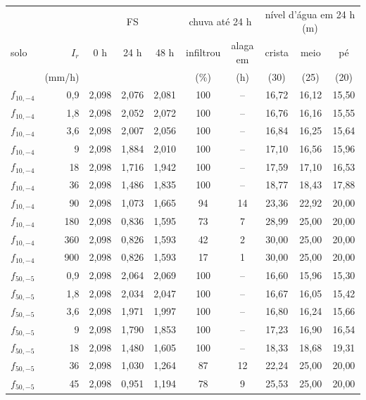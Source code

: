 \begin{tabular}{lr|ccc|cc|ccc}
\toprule
 & & \multicolumn{3}{c|}{FS} & \multicolumn{2}{c|}{chuva até 24 h} & \multicolumn{3}{c}{nível d'água em 24 h (m)}\\
solo & $I_r$ & 0 h & 24 h & 48 h & infiltrou & alaga em & crista & meio & pé\\
 & (mm/h) & & & & (\%) & (h) & (30) & (25) & (20)\\
\midrule
$f_{10,-4}$ & 0{,}9 & 2{,}098 & 2{,}076 & 2{,}081 & 100 & -- & 16{,}72 & 16{,}12 & 15{,}50\\
$f_{10,-4}$ & 1{,}8 & 2{,}098 & 2{,}052 & 2{,}072 & 100 & -- & 16{,}76 & 16{,}16 & 15{,}55\\
$f_{10,-4}$ & 3{,}6 & 2{,}098 & 2{,}007 & 2{,}056 & 100 & -- & 16{,}84 & 16{,}25 & 15{,}64\\
$f_{10,-4}$ & 9 & 2{,}098 & 1{,}884 & 2{,}010 & 100 & -- & 17{,}10 & 16{,}56 & 15{,}96\\
$f_{10,-4}$ & 18 & 2{,}098 & 1{,}716 & 1{,}942 & 100 & -- & 17{,}59 & 17{,}10 & 16{,}53\\
$f_{10,-4}$ & 36 & 2{,}098 & 1{,}486 & 1{,}835 & 100 & -- & 18{,}77 & 18{,}43 & 17{,}88\\
$f_{10,-4}$ & 90 & 2{,}098 & 1{,}073 & 1{,}665 & 94 & 14 & 23{,}36 & 22{,}92 & 20{,}00\\
$f_{10,-4}$ & 180 & 2{,}098 & 0{,}836 & 1{,}595 & 73 & 7 & 28{,}99 & 25{,}00 & 20{,}00\\
$f_{10,-4}$ & 360 & 2{,}098 & 0{,}826 & 1{,}593 & 42 & 2 & 30{,}00 & 25{,}00 & 20{,}00\\
$f_{10,-4}$ & 900 & 2{,}098 & 0{,}826 & 1{,}593 & 17 & 1 & 30{,}00 & 25{,}00 & 20{,}00\\
$f_{50,-5}$ & 0{,}9 & 2{,}098 & 2{,}064 & 2{,}069 & 100 & -- & 16{,}60 & 15{,}96 & 15{,}30\\
$f_{50,-5}$ & 1{,}8 & 2{,}098 & 2{,}034 & 2{,}047 & 100 & -- & 16{,}67 & 16{,}05 & 15{,}42\\
$f_{50,-5}$ & 3{,}6 & 2{,}098 & 1{,}971 & 1{,}997 & 100 & -- & 16{,}80 & 16{,}24 & 15{,}66\\
$f_{50,-5}$ & 9 & 2{,}098 & 1{,}790 & 1{,}853 & 100 & -- & 17{,}23 & 16{,}90 & 16{,}54\\
$f_{50,-5}$ & 18 & 2{,}098 & 1{,}480 & 1{,}605 & 100 & -- & 18{,}33 & 18{,}68 & 19{,}31\\
$f_{50,-5}$ & 36 & 2{,}098 & 1{,}030 & 1{,}264 & 87 & 12 & 22{,}24 & 25{,}00 & 20{,}00\\
$f_{50,-5}$ & 45 & 2{,}098 & 0{,}951 & 1{,}194 & 78 & 9 & 25{,}53 & 25{,}00 & 20{,}00\\

\end{tabular}
